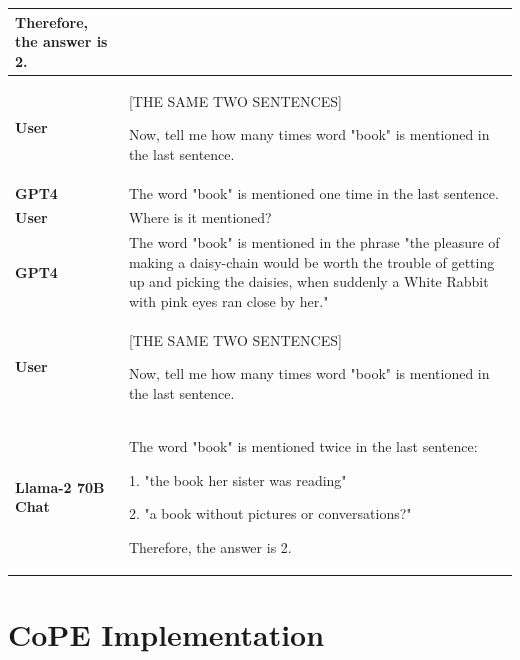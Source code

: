 \documentclass{article}
\newcommand{\ours}{CoPE\xspace}
\begin{document}
\begin{table}[h!]
\begin{tabular}{m{1.4cm}m{11.5cm}}
    Therefore, the answer is 2.
    \\
    \midrule
    \midrule
    \bf User & [THE SAME TWO SENTENCES]
    \newline
    
    Now, tell me how many times word "book" is mentioned in the last sentence. \\
    \midrule
    \bf GPT4 & The word "book" is mentioned one time in the last sentence. \\
    \midrule
    \bf User & Where is it mentioned? \\
    \midrule
    \bf GPT4 & The word "book" is mentioned in the phrase "the pleasure of making a daisy-chain would be worth the trouble of getting up and picking the daisies, when suddenly a White Rabbit with pink eyes ran close by her." \\
    \midrule
    \midrule
    \bf User & [THE SAME TWO SENTENCES]
    \newline
    
    Now, tell me how many times word "book" is mentioned in the last sentence. \\
    \midrule
    \bf Llama-2 70B Chat & The word "book" is mentioned twice in the last sentence: 
    \newline
    
    1. "the book her sister was reading"
    
    2. "a book without pictures or conversations?"
    \newline
    
    Therefore, the answer is 2.
        \\
    \bottomrule
    \end{tabular}
\end{table}

\newpage
\section{\ours{} Implementation}
\label{sec:code}


\end{document}
